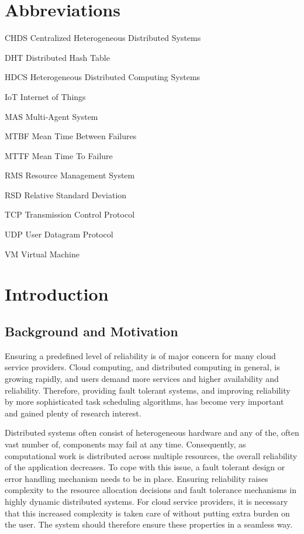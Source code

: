 \documentclass{cslthse-msc}
\newcommand{\abbrlabel}[1]{\makebox[3cm][l]{\textbf{#1}\ }}
\newenvironment{abbreviations}{\begin{list}{}{\renewcommand{\makelabel}{\abbrlabel}}}{\end{list}}
\begin{document}
\chapter*{Abbreviations}
\begin{abbreviations}
\item[CHDS] Centralized Heterogeneous Distributed Systems
\item[DHT] Distributed Hash Table
\item[HDCS] Heterogeneous Distributed Computing Systems
\item[IoT] Internet of Things
\item[MAS] Multi-Agent System
\item[MTBF] Mean Time Between Failures
\item[MTTF] Mean Time To Failure
\item[RMS] Resource Management System
\item[RSD] Relative Standard Deviation
\item[TCP] Transmission Control Protocol
\item[UDP] User Datagram Protocol
\item[VM] Virtual Machine
\end{abbreviations}

\chapter{Introduction} \label{ch:introduction} 
\section{Background and Motivation} \label{sec:introduction_backgroud_motivation}
Ensuring a predefined level of reliability is of major concern for many cloud service providers. Cloud computing, and distributed computing in general, is growing rapidly, and users demand more services and higher availability and reliability. Therefore, providing fault tolerant systems, and improving reliability by more sophisticated task scheduling algorithms, has become very important and gained plenty of research interest.

Distributed systems often consist of heterogeneous hardware and any of the, often vast number of, components may fail at any time. Consequently, as computational work is distributed across multiple resources, the overall reliability of the application decreases. To cope with this issue, a fault tolerant design or error handling mechanism needs to be in place. Ensuring reliability raises complexity to the resource allocation decisions and fault tolerance mechanisms in highly dynamic distributed systems. For cloud service providers, it is necessary that this increased complexity is taken care of without putting extra burden on the user. The system should therefore ensure these properties in a seamless way.
\end{document}
